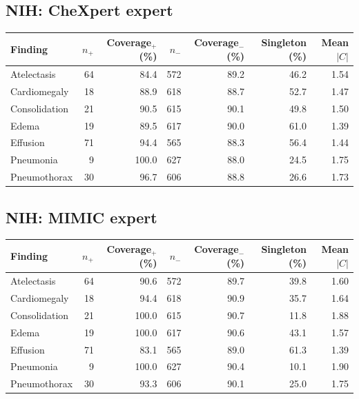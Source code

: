 \subsection{NIH: CheXpert expert}
\begin{center}\small
\begin{tabular}{lrrrrrr}
\toprule
Finding & $n_+$ & Coverage$_+$ (\%) & $n_-$ & Coverage$_-$ (\%) & Singleton (\%) & Mean $|C|$\\
\midrule
Atelectasis & 64 & 84.4 & 572 & 89.2 & 46.2 & 1.54\\
Cardiomegaly & 18 & 88.9 & 618 & 88.7 & 52.7 & 1.47\\
Consolidation & 21 & 90.5 & 615 & 90.1 & 49.8 & 1.50\\
Edema & 19 & 89.5 & 617 & 90.0 & 61.0 & 1.39\\
Effusion & 71 & 94.4 & 565 & 88.3 & 56.4 & 1.44\\
Pneumonia & 9 & 100.0 & 627 & 88.0 & 24.5 & 1.75\\
Pneumothorax & 30 & 96.7 & 606 & 88.8 & 26.6 & 1.73\\
\bottomrule\end{tabular}\end{center}
\subsection{NIH: MIMIC expert}
\begin{center}\small
\begin{tabular}{lrrrrrr}
\toprule
Finding & $n_+$ & Coverage$_+$ (\%) & $n_-$ & Coverage$_-$ (\%) & Singleton (\%) & Mean $|C|$\\
\midrule
Atelectasis & 64 & 90.6 & 572 & 89.7 & 39.8 & 1.60\\
Cardiomegaly & 18 & 94.4 & 618 & 90.9 & 35.7 & 1.64\\
Consolidation & 21 & 100.0 & 615 & 90.7 & 11.8 & 1.88\\
Edema & 19 & 100.0 & 617 & 90.6 & 43.1 & 1.57\\
Effusion & 71 & 83.1 & 565 & 89.0 & 61.3 & 1.39\\
Pneumonia & 9 & 100.0 & 627 & 90.4 & 10.1 & 1.90\\
Pneumothorax & 30 & 93.3 & 606 & 90.1 & 25.0 & 1.75\\
\bottomrule\end{tabular}\end{center}
